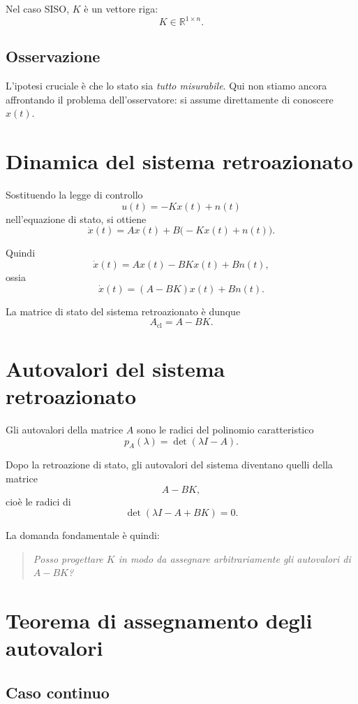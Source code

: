 Nel caso SISO, \(K\) è un vettore riga:
\[
K\in\mathbb{R}^{1\times n}.
\]

\subsection*{Osservazione}

L'ipotesi cruciale è che lo stato sia \emph{tutto misurabile}.
Qui non stiamo ancora affrontando il problema dell'osservatore:
si assume direttamente di conoscere \(x(t)\).

\section{Dinamica del sistema retroazionato}

Sostituendo la legge di controllo
\[
u(t)=-Kx(t)+n(t)
\]
nell'equazione di stato,
si ottiene
\[
\dot x(t)=Ax(t)+B\bigl(-Kx(t)+n(t)\bigr).
\]

Quindi
\[
\dot x(t)=Ax(t)-BKx(t)+Bn(t),
\]
ossia
\[
\dot x(t)=(A-BK)x(t)+Bn(t).
\]

La matrice di stato del sistema retroazionato è dunque
\[
A_{\text{cl}}=A-BK.
\]

\section{Autovalori del sistema retroazionato}

Gli autovalori della matrice \(A\) sono le radici del polinomio caratteristico
\[
p_A(\lambda)=\det(\lambda I-A).
\]

Dopo la retroazione di stato, gli autovalori del sistema diventano quelli della matrice
\[
A-BK,
\]
cioè le radici di
\[
\det(\lambda I-A+BK)=0.
\]

La domanda fondamentale è quindi:

\begin{quote}
\emph{Posso progettare \(K\) in modo da assegnare arbitrariamente gli autovalori di \(A-BK\)?}
\end{quote}

\section{Teorema di assegnamento degli autovalori}

\subsection*{Caso continuo}

